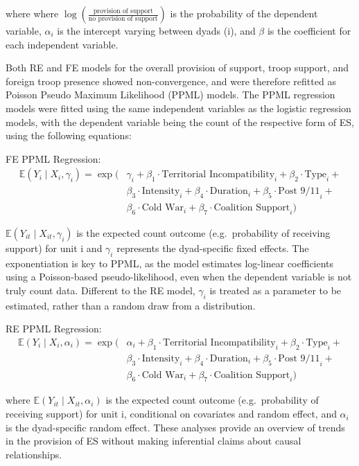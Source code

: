 \documentclass[
]{article}
\begin{document}
where where
\(\log \left( \frac{\text{provision of support}}{\text{no provision of support}} \right)\)
is the probability of the dependent variable, \(\alpha_i\) is the
intercept varying between dyads (i), and \(\beta\) is the coefficient
for each independent variable.

Both RE and FE models for the overall provision of support, troop
support, and foreign troop presence showed non-convergence, and were
therefore refitted as Poisson Pseudo Maximum Likelihood (PPML) models.
The PPML regression models were fitted using the same independent
variables as the logistic regression models, with the dependent variable
being the count of the respective form of ES, using the following
equations:

FE PPML Regression: \[
\begin{aligned}
\mathbb{E}(Y_{i} \mid X_{i}, \gamma_i) = \exp\bigg(&
\gamma_i + 
\beta_1 \cdot \text{Territorial Incompatibility}_{i} + 
\beta_2 \cdot \text{Type}_{i} + \\
&\beta_3 \cdot \text{Intensity}_{i} + 
\beta_4 \cdot \text{Duration}_{i} + 
\beta_5 \cdot \text{Post 9/11}_{i} + \\
&\beta_6 \cdot \text{Cold War}_{i} + 
\beta_7 \cdot \text{Coalition Support}_{i}
\bigg)
\end{aligned}
\]

\(\mathbb{E}(Y_{it} \mid X_{it}, \gamma_i)\) is the expected count
outcome (e.g.~probability of receiving support) for unit i and
\(\gamma_i\) represents the dyad-specific fixed effects. The
exponentiation is key to PPML, as the model estimates log-linear
coefficients using a Poisson-based pseudo-likelihood, even when the
dependent variable is not truly count data. Different to the RE model,
\(\gamma_i\) is treated as a parameter to be estimated, rather than a
random draw from a distribution.

RE PPML Regression: \[
\begin{aligned}
\mathbb{E}(Y_{i} \mid X_{i}, \alpha_i) = \exp\bigg(&
\alpha_i + 
\beta_1 \cdot \text{Territorial Incompatibility}_{i} + 
\beta_2 \cdot \text{Type}_{i} + \\
&\beta_3 \cdot \text{Intensity}_{i} + 
\beta_4 \cdot \text{Duration}_{i} + 
\beta_5 \cdot \text{Post 9/11}_{i} + \\
&\beta_6 \cdot \text{Cold War}_{i} + 
\beta_7 \cdot \text{Coalition Support}_{i}
\bigg)
\end{aligned}
\]

where \(\mathbb{E}(Y_{it} \mid X_{it}, \alpha_i)\) is the expected count
outcome (e.g.~probability of receiving support) for unit i, conditional
on covariates and random effect, and \(\alpha_i\) is the dyad-specific
random effect. These analyses provide an overview of trends in the
provision of ES without making inferential claims about causal
relationships.
\end{document}
